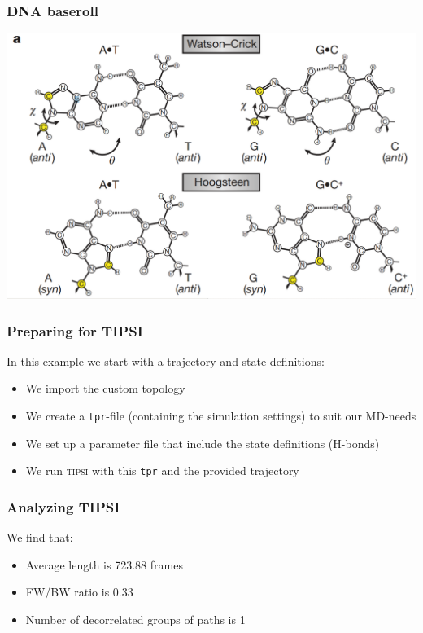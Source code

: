 \documentclass[hyperref={pdfpagelabels=false}]{beamer}
\begin{document}
\begin{frame}
\frametitle{DNA baseroll} 
\begin{center}
\includegraphics[scale=0.2]{images/pairing.png}
\end{center}
\end{frame}

\begin{frame}
\frametitle{Preparing for \textsc{TIPSI}} 
In this example we start with a trajectory and state definitions:
\begin{itemize}
\item We import the custom topology
\item We create a \texttt{tpr}-file (containing the simulation settings) to suit our MD-needs
\item We set up a parameter file that include the state definitions (H-bonds)
\item We run \textsc{tipsi} with this \texttt{tpr} and the provided trajectory
\end{itemize}
\end{frame}

\begin{frame}
\frametitle{Analyzing \textsc{TIPSI}}

We find that:

\begin{itemize}
\item Average length is 723.88 frames
\item FW/BW ratio is 0.33
\item Number of decorrelated groups of paths is 1
\end{itemize}
\end{frame}
\end{document}
